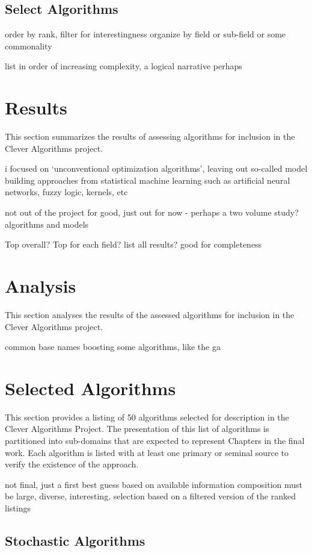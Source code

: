 \documentclass[a4paper, 11pt]{article}
\begin{document}
\subsection{Select Algorithms}
order by rank, filter for interestingness
organize by field or sub-field or some commonality

list in order of increasing complexity, a logical narrative perhaps

% 
% 
\section{Results}
\label{sec:results}
This section summarizes the results of assessing algorithms for inclusion in the Clever Algorithms project.

i focused on `unconventional optimization algorithms', leaving out so-called model building approaches from statistical machine learning such as artificial neural networks, fuzzy logic, kernels, etc 

not out of the project for good, just out for now - perhaps a two volume study? algorithms and models

Top overall?
Top for each field?
list all results? good for completeness 

% 
% 
\section{Analysis}
\label{sec:analysis}
This section analyses the results of the assessed algorithms for inclusion in the Clever Algorithms project.

common base names boosting some algorithms, like the ga


\section{Selected Algorithms}
\label{sec:selection}
This section provides a listing of 50 algorithms selected for description in the Clever Algorithms Project. The presentation of this list of algorithms is partitioned into sub-domains that are expected to represent Chapters in the final work. Each algorithm is listed with at least one primary or seminal source to verify the existence of the approach.

not final, just a first best guess based on available information
composition must be large, diverse, interesting. 
selection based on a filtered version of the ranked listings

\subsection{Stochastic Algorithms}
\end{document}
